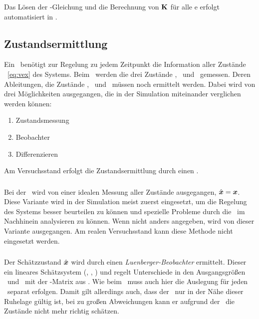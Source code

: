 Das Lösen der \ricc-Gleichung und die Berechnung von ${\boldsymbol{\mathrm{K}}}$ für alle \ap e erfolgt automatisiert in \ml.


\subsection{Zustandsermittlung}\label{subsec:zse} 

Ein \zsr\ benötigt zur Regelung zu jedem Zeitpunkt die Information aller Zustände \vex\ \eqref{eq:vex} des Systems. Beim \spds\ werden die drei Zustände \xo, \phe\ und \phz\ gemessen. Deren Ableitungen, die Zustände \xop, \phep\ und \phzp\ müssen noch ermittelt werden. Dabei wird von drei Möglichkeiten ausgegangen, die in der Simulation miteinander verglichen werden können:
\begin{enumerate}
	\item Zustandsmessung
	\item Beobachter
	\item Differenzieren 
\end{enumerate}
Am Versuchsstand erfolgt die Zustandsermittlung durch einen \beob.

\subsubsection{\zm}
Bei der \zm\ wird von einer idealen Messung aller Zustände ausgegangen, \dah $\hat{\boldsymbol{x}}=\boldsymbol{x}$. 
Diese Variante wird in der Simulation meist zuerst eingesetzt, um die Regelung des Systems besser beurteilen zu können und spezielle Probleme durch die \ze\ im Nachhinein analysieren zu können.
Wenn nicht anders angegeben, wird von dieser Variante ausgegangen.
Am realen Versuchsstand kann diese Methode nicht eingesetzt werden.

\subsubsection{\beob}\label{subsec:beob}
Der Schätzzustand $\hat{\boldsymbol{x}}$ wird durch einen \emph{Luenberger-Beobachter} ermittelt. 
Dieser  ein lineares Schätzsystem (, , ) und regelt Unterschiede in den Ausgangsgrößen \vey\ und \veyd\ mit der \beob-Matrix  aus \cite{AdamyRT2}. 
Wie beim \zsr\ muss auch hier die Auslegung für jeden \ap\ separat erfolgen.
Damit gilt allerdings auch, dass der \beob\ nur in der Nähe dieser Ruhelage gültig ist, bei zu großen Abweichungen kann er aufgrund der \lin\ die Zustände nicht mehr richtig schätzen.

